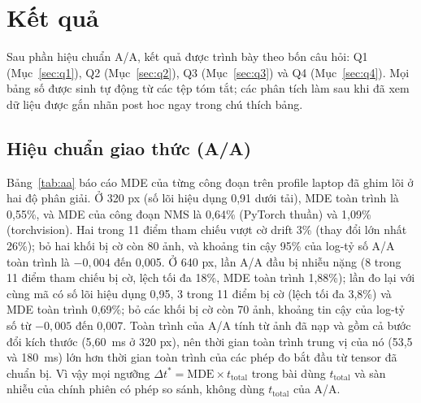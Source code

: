 \documentclass[a4paper,fleqn]{cas-dc}
\begin{document}
\section{Kết quả}
\label{sec:results}
Sau phần hiệu chuẩn A/A, kết quả được trình bày theo bốn câu hỏi: Q1 (Mục~\ref{sec:q1}), Q2 (Mục~\ref{sec:q2}), Q3 (Mục~\ref{sec:q3}) và Q4 (Mục~\ref{sec:q4}). Mọi bảng số được sinh tự động từ các tệp tóm tắt; các phân tích làm sau khi đã xem dữ liệu được gắn nhãn post hoc ngay trong chú thích bảng.

\subsection{Hiệu chuẩn giao thức (A/A)}
\label{sec:newprotocol}
Bảng~\ref{tab:aa} báo cáo MDE của từng công đoạn trên profile laptop đã ghim lõi ở hai độ phân giải. Ở 320 px (số lõi hiệu dụng 0,91 dưới tải), MDE toàn trình là 0,55\%, và MDE của công đoạn NMS là 0,64\% (PyTorch thuần) và 1,09\% (torchvision). Hai trong 11 điểm tham chiếu vượt cờ drift 3\% (thay đổi lớn nhất 26\%); bỏ hai khối bị cờ còn 80 ảnh, và khoảng tin cậy 95\% của log-tỷ số A/A toàn trình là $-0{,}004$ đến 0,005. Ở 640 px, lần A/A đầu bị nhiễu nặng (8 trong 11 điểm tham chiếu bị cờ, lệch tối đa 18\%, MDE toàn trình 1,88\%); lần đo lại với cùng mã có số lõi hiệu dụng 0,95, 3 trong 11 điểm bị cờ (lệch tối đa 3,8\%) và MDE toàn trình 0,69\%; bỏ các khối bị cờ còn 70 ảnh, khoảng tin cậy của log-tỷ số từ $-0{,}005$ đến 0,007. Toàn trình của A/A tính từ ảnh đã nạp và gồm cả bước đổi kích thước (5,60~ms ở 320 px), nên thời gian toàn trình trung vị của nó (53,5 và 180~ms) lớn hơn thời gian toàn trình của các phép đo bắt đầu từ tensor đã chuẩn bị. Vì vậy mọi ngưỡng $\Delta t^{*} = \mathrm{MDE}\times t_{\mathrm{total}}$ trong bài dùng $t_{\mathrm{total}}$ và sàn nhiễu của chính phiên có phép so sánh, không dùng $t_{\mathrm{total}}$ của A/A.
\end{document}
